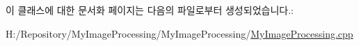 이 클래스에 대한 문서화 페이지는 다음의 파일로부터 생성되었습니다.\-:\begin{DoxyCompactItemize}
\item 
H\-:/\-Repository/\-My\-Image\-Processing/\-My\-Image\-Processing/\hyperlink{_my_image_processing_8cpp}{My\-Image\-Processing.\-cpp}\end{DoxyCompactItemize}

